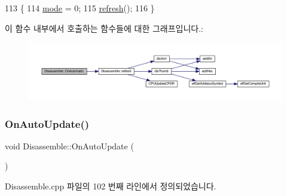 \begin{DoxyCode}
113 \{
114   \mbox{\hyperlink{class_disassemble_a30b707e1da3b01abda044e78929404cc}{mode}} = 0;
115   \mbox{\hyperlink{class_disassemble_a7cdf11d53ce0f170ad7dd8fc66961805}{refresh}}();
116 \}
\end{DoxyCode}
이 함수 내부에서 호출하는 함수들에 대한 그래프입니다.\+:
\nopagebreak
\begin{figure}[H]
\begin{center}
\leavevmode
\includegraphics[width=350pt]{class_disassemble_a713e75749b5c7c79927075b57431a298_cgraph}
\end{center}
\end{figure}
\mbox{\label{class_disassemble_a5423cb1c85c1e4bb05b3d4018c804826}} 
\subsubsection{\texorpdfstring{On\+Auto\+Update()}{OnAutoUpdate()}}
{\footnotesize\ttfamily void Disassemble\+::\+On\+Auto\+Update (\begin{DoxyParamCaption}{ }\end{DoxyParamCaption})\hspace{0.3cm}{\ttfamily [protected]}}



Disassemble.\+cpp 파일의 102 번째 라인에서 정의되었습니다.


